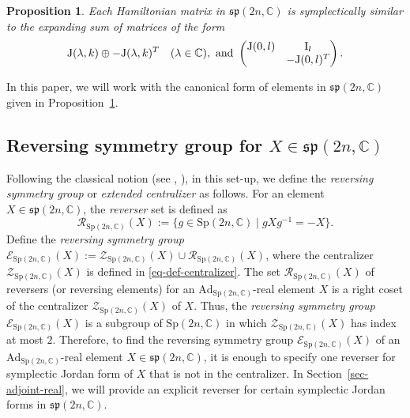 \documentclass[11pt,reqno]{amsart}
\numberwithin{equation}{section}
\newtheorem{proposition}[theorem]{Proposition}
\theoremstyle{definition}
\def\C{\mathbb C}
\def\C{\mathbb {C}}
\newcommand{\secref}[1]{Section~\ref{#1}}
\newcommand{\propref}[1]{Proposition~\ref{#1}}
\begin{document}
\begin{proposition}\label{prop-modified-canonical-form}
	Each Hamiltonian matrix in $ \mathfrak{sp}(2n,\mathbb{C})$ is symplectically similar to the expanding sum of matrices of the form
	\begin{equation}
		\mathrm{J}(\lambda, k) \oplus - \mathrm{J}(\lambda, k)^{T}  \quad (\lambda \in \C), \hbox{ and }  \begin{pmatrix}
			\mathrm{J}(0, l) & \mathrm{I}_{l} \\
			& - \mathrm{J}(0, l)^{T}
		\end{pmatrix}.
	\end{equation}
\end{proposition}

In this paper, we will work with the canonical form of elements in $ \mathfrak{sp}(2n,\mathbb{C})$ given in \propref{prop-modified-canonical-form}.

\subsection{Reversing symmetry group for  $ X \in \mathfrak{sp}(2n,\mathbb{C})$}\label{sec-rev-symm-gp}

Following the classical notion (see \cite{BR}, \cite[Section 2.1.4]{OS}), in this set-up,  we define the  \textit{reversing symmetry group} or \textit{extended centralizer} as follows. 
For an element $ X \in \mathfrak{sp}(2n,\mathbb{C})$, the {\it reverser} set is defined as 
$$ \mathcal{R}_{\mathrm{Sp}(2n,\mathbb{C})}(X) := \{ g \in \mathrm{Sp}(2n,\mathbb{C}) \mid gXg^{-1} = -X \}.$$
Define the \textit{reversing symmetry group}  $\mathcal{E}_{\mathrm{Sp}(2n,\mathbb{C})}(X) := \mathcal{Z}_{\mathrm{Sp}(2n,\mathbb{C})}(X) \cup \mathcal{R}_{\mathrm{Sp}(2n,\mathbb{C})}(X)$, where the centralizer  $\mathcal{Z}_{\mathrm{Sp}(2n,\mathbb{C})}(X)$ is  defined in \eqref{eq-def-centralizer}.
The set $\mathcal{R}_{\mathrm{Sp}(2n,\mathbb{C})}(X)$ of reversers (or reversing elements) for an $\mathrm{Ad}_{\mathrm{Sp}(2n,\mathbb{C})}$-real  element $X$ is a right coset of the centralizer $\mathcal{Z}_{\mathrm{Sp}(2n,\mathbb{C})}(X)$ of $X$. Thus, the \textit{reversing symmetry group}  $\mathcal{E}_{\mathrm{Sp}(2n,\mathbb{C})}(X)$ is a subgroup of $\mathrm{Sp}(2n,\mathbb{C})$ in which $\mathcal{Z}_{\mathrm{Sp}(2n,\mathbb{C})}(X)$ has index at most $2$.
Therefore, to find the reversing symmetry group $\mathcal{E}_{\mathrm{Sp}(2n,\mathbb{C})}(X)$ of an $\mathrm{Ad}_{\mathrm{Sp}(2n,\mathbb{C})}$-real element $ X \in \mathfrak{sp}(2n,\mathbb{C})$, it is enough to specify one reverser for symplectic Jordan form of $X$ that is not in the centralizer.  In \secref{sec-adjoint-real}, we will provide an explicit reverser for certain symplectic Jordan forms in $\mathfrak{sp}(2n,\mathbb{C})$.  
\end{document}
